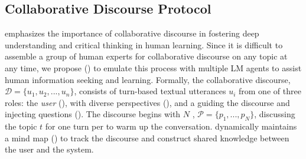 \subsection{Collaborative Discourse Protocol}
\label{sec:discourse_protocol}
\citet{nussbaum2008collaborative} emphasizes the importance of collaborative discourse in fostering deep understanding and critical thinking in human learning. Since it is difficult to assemble a group of human experts for collaborative discourse on any topic at any time, we propose \system () to emulate this process with multiple LM agents to assist human information seeking and learning. Formally, the collaborative discourse, $\mathcal{D}=\{u_1, u_2, ..., u_n\}$, consists of turn-based textual utterances $u_i$ from one of three roles: 
the \textit{user} (), \textit{\experts} with diverse perspectives (), and a \textit{\moderator} guiding the discourse and injecting questions (). The discourse begins with $N$ \experts, $\mathcal{P}=\{p_1, ..., p_N\}$, discussing the topic $t$ for one turn per \expert to warm up the conversation. \system dynamically maintains a mind map () to track the discourse and construct shared knowledge between the user and the system.

